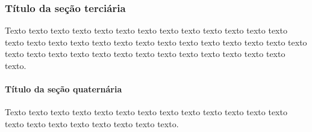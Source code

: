 \subsubsection{Título da seção terciária}
Texto texto texto texto texto texto texto texto texto texto texto texto texto texto texto texto texto texto texto texto texto texto texto texto texto texto texto texto texto texto texto texto texto texto texto texto texto texto texto texto texto.

\paragraph{Título da seção quaternária}
Texto texto texto texto texto texto texto texto texto texto texto texto texto texto texto texto texto texto texto texto texto.